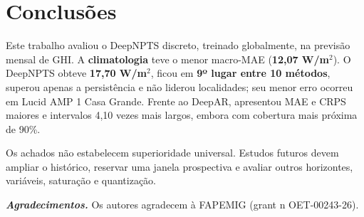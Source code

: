 \documentclass[12pt,a4paper,fleqn]{article}
\begin{document}
\section{Conclusões}
\label{sec:conclusoes}

Este trabalho avaliou o DeepNPTS discreto, treinado globalmente, na previsão mensal de GHI. A \textbf{climatologia} teve o menor macro-MAE (\textbf{12,07 W/m$^2$}). O DeepNPTS obteve \textbf{17,70 W/m$^2$}, ficou em \textbf{9º lugar entre 10 métodos}, superou apenas a persistência e não liderou localidades; seu menor erro ocorreu em Lucid AMP 1 Casa Grande. Frente ao DeepAR, apresentou MAE e CRPS maiores e intervalos 4,10 vezes mais largos, embora com cobertura mais próxima de 90\%.

Os achados não estabelecem superioridade universal. Estudos futuros devem ampliar o histórico, reservar uma janela prospectiva e avaliar outros horizontes, variáveis, saturação e quantização.

\vspace{12pt}
\noindent\textbf{\textit{Agradecimentos.}} Os autores agradecem à FAPEMIG (grant n OET-00243-26).
\end{document}
